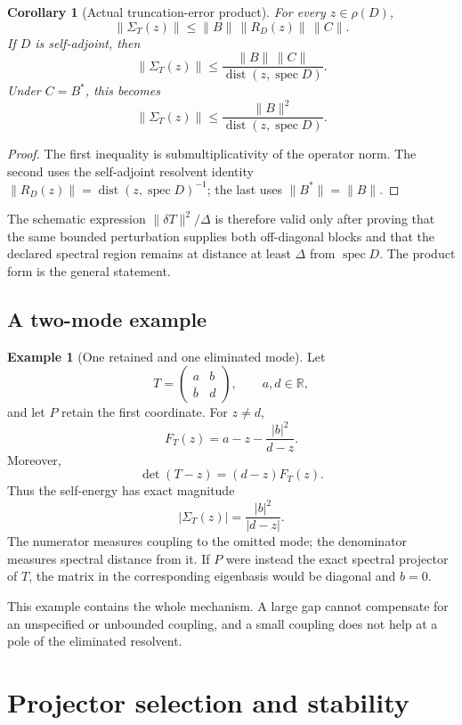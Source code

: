 \documentclass[11pt]{article}
\newtheorem{corollary}[theorem]{Corollary}
\theoremstyle{definition}
\newtheorem{example}[theorem]{Example}
\theoremstyle{remark}
\newcommand{\RR}{\mathbb R}
\newcommand{\1}{\mathbf 1}
\newcommand{\dist}{\operatorname{dist}}
\newcommand{\spec}{\operatorname{spec}}
\begin{document}
\begin{corollary}[Actual truncation-error product]
\label{cor:product}
For every \(z\in\rho(D)\),
\[
  \|\Sigma_T(z)\|
  \leq
  \|B\|\,\|R_D(z)\|\,\|C\|.
\]
If \(D\) is self-adjoint, then
\[
  \|\Sigma_T(z)\|
  \leq
  \frac{\|B\|\,\|C\|}
       {\dist(z,\spec D)}.
\]
Under \(C=B^*\), this becomes
\[
  \|\Sigma_T(z)\|
  \leq
  \frac{\|B\|^2}
       {\dist(z,\spec D)}.
\]
\end{corollary}

\begin{proof}
The first inequality is submultiplicativity of the operator norm.  The
second uses the self-adjoint resolvent identity
\(\|R_D(z)\|=\dist(z,\spec D)^{-1}\); the last uses
\(\|B^*\|=\|B\|\).
\end{proof}

The schematic expression \(\|\delta T\|^2/\Delta\) is therefore valid only
after proving that the same bounded perturbation supplies both
off-diagonal blocks and that the declared spectral region remains at
distance at least \(\Delta\) from \(\spec D\).  The product form is the
general statement.

\subsection{A two-mode example}

\begin{example}[One retained and one eliminated mode]
Let
\[
  T=
  \begin{pmatrix}
    a&b\\ \overline b&d
  \end{pmatrix},
  \qquad a,d\in\RR,
\]
and let \(P\) retain the first coordinate.  For \(z\neq d\),
\[
  F_T(z)
  =
  a-z-\frac{|b|^2}{d-z}.
\]
Moreover,
\[
  \det(T-z)=(d-z)F_T(z).
\]
Thus the self-energy has exact magnitude
\[
  |\Sigma_T(z)|=\frac{|b|^2}{|d-z|}.
\]
The numerator measures coupling to the omitted mode; the denominator
measures spectral distance from it.  If \(P\) were instead the exact
spectral projector of \(T\), the matrix in the corresponding eigenbasis
would be diagonal and \(b=0\).
\end{example}

This example contains the whole mechanism.  A large gap cannot compensate
for an unspecified or unbounded coupling, and a small coupling does not
help at a pole of the eliminated resolvent.

\section{Projector selection and stability}
\label{sec:projector}
\end{document}
